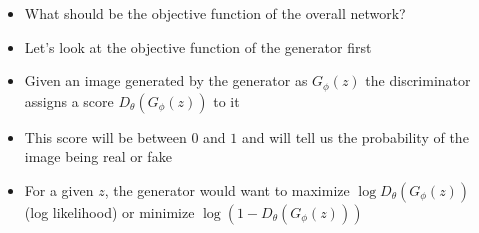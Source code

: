 \begin{frame}
	\begin{columns}
		\begin{overlayarea}{\textwidth}{\textheight}
			\vspace*{10mm}
			\begin{center}
						
			\end{center}		
		\end{overlayarea}

		\begin{overlayarea}{\textwidth}{\textheight}
			\begin{itemize}[<+->]
				\item What should be the objective function of the overall network?
				\item Let's look at the objective function of the generator first 
				\item Given an image generated by the generator as $G_\phi(z)$ the discriminator assigns a score $D_\theta(G_\phi(z))$ to it 
				\item This score will be between $0$ and $1$ and will tell us the probability of the image being real or fake 
				\item For a given $z$, the generator would want to maximize  $\log D_\theta(G_\phi(z))$ (log likelihood) or minimize $\log (1 - D_\theta(G_\phi(z)))$
			\end{itemize}
			\vspace{10mm}
			
		\end{overlayarea}
	\end{columns}
\end{frame}

